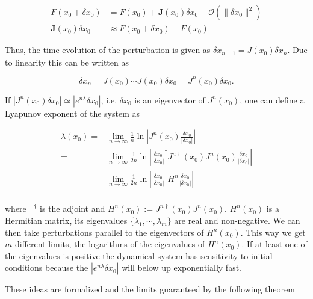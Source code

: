 \begin{align}
    F(x_0 + \delta x_0) &= F(x_0) + \boldsymbol{J}(x_0)\delta x_0 + \mathcal{O}(\|\delta x_0 \|^2) \\
    \boldsymbol{J}(x_0) \delta x_0 &\approx F(x_0 + \delta x_0) - F(x_0) \label{eq:jacobian_perturb}
\end{align}

Thus, the time evolution of the perturbation is given as $\delta x_{n+1} = J(x_0) \delta x_{n}$. Due to linearity this can be written as

\begin{equation}
    \delta x_n = J(x_{0}) \cdots J(x_0)\delta x_0 = J^n(x_0) \delta x_0.
\end{equation}

If $|J^n(x_0) \delta x_0 | \simeq | e^{n\lambda} \delta x_0 |$, i.e. $\delta x_0$ is an eigenvector of $J^n(x_0)$, one can define a Lyapunov exponent of the system as 

\begin{align}
 \lambda(x_0)    =& \lim_{n \rightarrow \infty} \frac{1}{n} \ln \left\vert J^n(x_0) \frac{\delta x_0}{|\delta x_0|} \right\vert \nonumber \\
                 =& \lim_{n \rightarrow \infty} \frac{1}{2n} \ln \left\vert \frac{\delta x_0}{|\delta x_0|}^{\dag} J^{n\dag}(x_0) J^n(x_0) \frac{\delta x_0}{|\delta x_0|} \right\vert \nonumber \\
                 =& \lim_{n \rightarrow \infty} \frac{1}{2n} \ln \left\vert \frac{\delta x_0}{|\delta x_0|}^{\dag} H^n \frac{\delta x_0}{|\delta x_0|} \right\vert \\
\end{align}

where $\phantom{J}^{\dag}$ is the adjoint and $H^n(x_0):=J^{n\dag}(x_0)J^n(x_0)$. $H^n(x_0)$ is a Hermitian matrix, its eigenvalues 
$\{\lambda_1, \cdots, \lambda_m\}$ are real and non-negative. We can then take perturbations parallel to the eigenvectors of $H^n(x_0)$. This way we get 
$m$ different limits, the logarithms of the eigenvalues of $H^n(x_0)$. If at least one of the eigenvalues is positive the dynamical system has sensitivity
to initial conditions because the $| e^{n\lambda} \delta x_0 |$ will below up exponentially fast.

These ideas are formalized and the limits guaranteed by the following theorem

